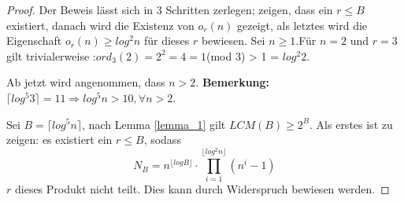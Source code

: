 \documentclass[12pt,oneside]{article}
\theoremstyle{remark}
\theoremstyle{definition}
\begin{document}
\begin{proof}
Der Beweis lässt sich in 3 Schritten zerlegen; zeigen, dass ein $r \leq B$ existiert, danach wird die Existenz von $o_{r}(n)$ gezeigt, als letztes wird die Eigenschaft $o_{r}(n) \geq log^2 n$ für dieses $r$ bewiesen. 
Sei $n \geq 1$.\newline\newline Für $n = 2$ und $r = 3$ gilt trivialerweise :\newline\newline $ord_{3}(2) = 2^2 = 4 = 1 $(mod 3) > 1 = $log^2 2$.

Ab jetzt wird angenommen, dass $n > 2$.\newline\newline
\textbf{Bemerkung: } $\lceil log^5 3 \rceil = 11 \Rightarrow log^5 n > 10, \forall n > 2$.\newline

Sei $B = \lceil log^5 n \rceil$, nach Lemma \ref{lemma_1} gilt $LCM(B) \geq 2^B$. Als erstes ist zu zeigen: es existiert ein $r \leq B$, sodass
\begin{equation}\label{prod_cor}
     N_{B} = n^{\lfloor log B \rfloor } \cdot \prod_{i = 1}^{\lfloor log^2 n \rfloor} (n^i - 1)
\end{equation}
$r$ dieses Produkt nicht teilt. Dies kann durch Widerspruch bewiesen werden.


\end{proof}
\end{document}
